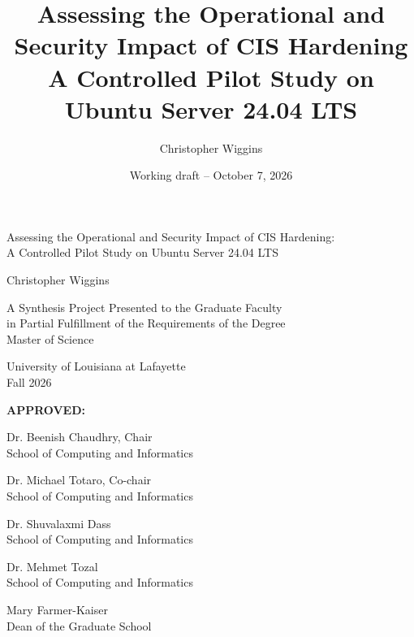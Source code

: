 \documentclass[12pt,letterpaper]{article}
\author{Christopher Wiggins}
\date{Working draft -- October 7, 2026}
\title{Assessing the Operational and Security Impact of CIS Hardening\\\medskip
\large A Controlled Pilot Study on Ubuntu Server 24.04 LTS}
\begin{document}
\begin{titlepage}
\thispagestyle{empty}
\singlespacing
\fontsize{12}{14}\selectfont
\setlength{\parindent}{0pt}

\vspace*{0.75in}

{\centering
Assessing the Operational and Security Impact of CIS Hardening:\\
A Controlled Pilot Study on Ubuntu Server 24.04 LTS\par

\vspace{0.40in}

Christopher Wiggins\par

\vspace{0.40in}

A Synthesis Project Presented to the Graduate Faculty\\
in Partial Fulfillment of the Requirements of the Degree\\
Master of Science\par

\vspace{0.40in}

University of Louisiana at Lafayette\\
Fall 2026\par
}

\vspace{1.55in}

{\raggedleft
\textbf{APPROVED:}\par

\vspace{14pt}

Dr. Beenish Chaudhry, Chair\\
School of Computing and Informatics\par

\vspace{14pt}

Dr. Michael Totaro, Co-chair\\
School of Computing and Informatics\par

\vspace{14pt}

Dr. Shuvalaxmi Dass\\
School of Computing and Informatics\par

\vspace{14pt}

Dr. Mehmet Tozal\\
School of Computing and Informatics\par

\vspace{14pt}

Mary Farmer-Kaiser\\
Dean of the Graduate School\par
}

\end{titlepage}
\end{document}
